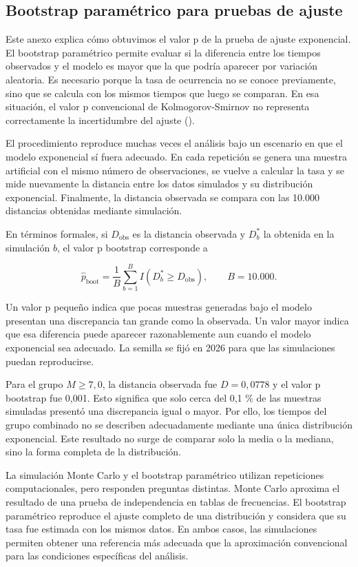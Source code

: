 \documentclass[
  spanish,
  letterpaper,
  DIV=11,
  numbers=noendperiod]{scrartcl}
\begin{document}
\subsection{Bootstrap paramétrico para pruebas de
ajuste}\label{sec-anexo-bootstrap-parametrico}

Este anexo explica cómo obtuvimos el valor p de la prueba de ajuste
exponencial. El bootstrap paramétrico permite evaluar si la diferencia
entre los tiempos observados y el modelo es mayor que la que podría
aparecer por variación aleatoria. Es necesario porque la tasa de
ocurrencia no se conoce previamente, sino que se calcula con los mismos
tiempos que luego se comparan. En esa situación, el valor p convencional
de Kolmogorov-Smirnov no representa correctamente la incertidumbre del
ajuste ().

El procedimiento reproduce muchas veces el análisis bajo un escenario en
que el modelo exponencial sí fuera adecuado. En cada repetición se
genera una muestra artificial con el mismo número de observaciones, se
vuelve a calcular la tasa y se mide nuevamente la distancia entre los
datos simulados y su distribución exponencial. Finalmente, la distancia
observada se compara con las 10.000 distancias obtenidas mediante
simulación.

En términos formales, si \(D_{\mathrm{obs}}\) es la distancia observada
y \(D_b^*\) la obtenida en la simulación \(b\), el valor p bootstrap
corresponde a

\[
\widehat p_{\mathrm{boot}}
=\frac{1}{B}\sum_{b=1}^{B}I\!\left(D_b^*\geq D_{\mathrm{obs}}\right),
\qquad B=10.000.
\]

Un valor p pequeño indica que pocas muestras generadas bajo el modelo
presentan una discrepancia tan grande como la observada. Un valor mayor
indica que esa diferencia puede aparecer razonablemente aun cuando el
modelo exponencial sea adecuado. La semilla se fijó en 2026 para que las
simulaciones puedan reproducirse.

Para el grupo \(M\geq7{,}0\), la distancia observada fue \(D=0{,}0778\)
y el valor p bootstrap fue 0,001. Esto significa que solo cerca del 0,1
\% de las muestras simuladas presentó una discrepancia igual o mayor.
Por ello, los tiempos del grupo combinado no se describen adecuadamente
mediante una única distribución exponencial. Este resultado no surge de
comparar solo la media o la mediana, sino la forma completa de la
distribución.

La simulación Monte Carlo y el bootstrap paramétrico utilizan
repeticiones computacionales, pero responden preguntas distintas. Monte
Carlo aproxima el resultado de una prueba de independencia en tablas de
frecuencias. El bootstrap paramétrico reproduce el ajuste completo de
una distribución y considera que su tasa fue estimada con los mismos
datos. En ambos casos, las simulaciones permiten obtener una referencia
más adecuada que la aproximación convencional para las condiciones
específicas del análisis.
\end{document}
